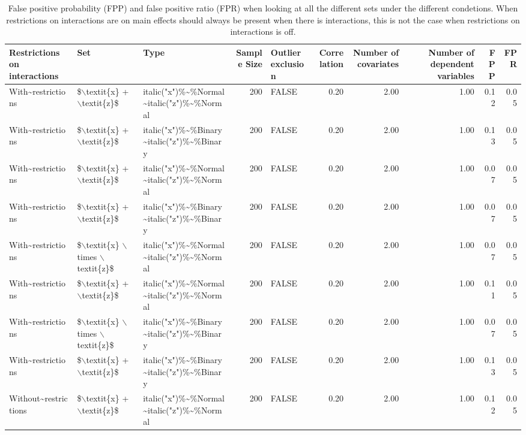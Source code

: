 \begin{longtable}{lllrlrrrrr}
\caption{False positive probability (FPP) and false positive ratio (FPR) when looking at all the different sets under the different condetions. When restrictions on interactions are on main effects should always be present when there is interactions, this is not the case when restrictions on interactions is off.} \\ 
  \hline
Restrictions on interactions & Set & Type & Sample Size & Outlier exclusion & Correlation & Number of covariates & Number of dependent variables & FPP & FPR \\ 
  \hline
With\~{}restrictions & \$$\backslash$textit\{x\} + $\backslash$textit\{z\}\$ & italic("x")\%\~{}\%Normal\~{}italic("z")\%\~{}\%Normal & 200 & FALSE & 0.20 & 2.00 & 1.00 & 0.12 & 0.05 \\ 
  With\~{}restrictions & \$$\backslash$textit\{x\} + $\backslash$textit\{z\}\$ & italic("x")\%\~{}\%Binary\~{}italic("z")\%\~{}\%Binary & 200 & FALSE & 0.20 & 2.00 & 1.00 & 0.13 & 0.05 \\ 
  With\~{}restrictions & \$$\backslash$textit\{x\} + $\backslash$textit\{z\}\$ & italic("x")\%\~{}\%Normal\~{}italic("z")\%\~{}\%Normal & 200 & FALSE & 0.20 & 2.00 & 1.00 & 0.07 & 0.05 \\ 
  With\~{}restrictions & \$$\backslash$textit\{x\} + $\backslash$textit\{z\}\$ & italic("x")\%\~{}\%Binary\~{}italic("z")\%\~{}\%Binary & 200 & FALSE & 0.20 & 2.00 & 1.00 & 0.07 & 0.05 \\ 
  With\~{}restrictions & \$$\backslash$textit\{x\} $\backslash$times $\backslash$textit\{z\}\$ & italic("x")\%\~{}\%Normal\~{}italic("z")\%\~{}\%Normal & 200 & FALSE & 0.20 & 2.00 & 1.00 & 0.07 & 0.05 \\ 
  With\~{}restrictions & \$$\backslash$textit\{x\} + $\backslash$textit\{z\}\$ & italic("x")\%\~{}\%Normal\~{}italic("z")\%\~{}\%Normal & 200 & FALSE & 0.20 & 2.00 & 1.00 & 0.11 & 0.05 \\ 
  With\~{}restrictions & \$$\backslash$textit\{x\} $\backslash$times $\backslash$textit\{z\}\$ & italic("x")\%\~{}\%Binary\~{}italic("z")\%\~{}\%Binary & 200 & FALSE & 0.20 & 2.00 & 1.00 & 0.07 & 0.05 \\ 
  With\~{}restrictions & \$$\backslash$textit\{x\} + $\backslash$textit\{z\}\$ & italic("x")\%\~{}\%Binary\~{}italic("z")\%\~{}\%Binary & 200 & FALSE & 0.20 & 2.00 & 1.00 & 0.13 & 0.05 \\ 
  Without\~{}restrictions & \$$\backslash$textit\{x\} + $\backslash$textit\{z\}\$ & italic("x")\%\~{}\%Normal\~{}italic("z")\%\~{}\%Normal & 200 & FALSE & 0.20 & 2.00 & 1.00 & 0.12 & 0.05 \\ 

\end{longtable}
